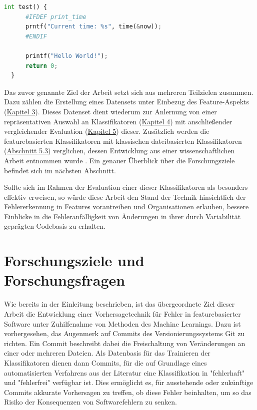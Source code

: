 \begin{lstlisting}[language=Python, caption=Exemplarische Darstellung eines fehlerhaften Features, frame=single, label=bug-code]
int test() {
	  #IFDEF print_time
	  prntf("Current time: %s", time(&now));
	  #ENDIF

	  printf("Hello World!");
	  return 0;
  }
\end{lstlisting}
 
Das zuvor genannte Ziel der Arbeit setzt sich aus mehreren Teilzielen zusammen. Dazu zählen die Erstellung eines Datensets unter Einbezug des Feature-Aspekts (\hyperref[dataset-creation]{Kapitel 3}). Dieses Datenset dient wiederum zur Anlernung von einer repräsentativen Auswahl an Klassifikatoren (\hyperref[training]{Kapitel 4}) mit anschließender vergleichender Evaluation (\hyperref[evaluation]{Kapitel 5}) dieser. Zusätzlich werden die featurebasierten Klassifikatoren mit klassischen dateibasierten Klassifikatoren (\hyperref[classic-eval]{Abschnitt 5.3}) verglichen, dessen Entwicklung aus einer wissenschaftlichen Arbeit entnommen wurde \cite{Moser2008}. Ein genauer Überblick über die Forschungsziele befindet sich im nächsten Abschnitt.

Sollte sich im Rahmen der Evaluation einer dieser Klassifikatoren als besonders effektiv erweisen, so würde diese Arbeit den Stand der Technik hinsichtlich der Fehlererkennung in Features vorantreiben und Organisationen erlauben, bessere Einblicke in die Fehleranfälligkeit von Änderungen in ihrer durch Variabilität geprägten Codebasis zu erhalten.

\section{Forschungsziele und Forschungsfragen}

Wie bereits in der Einleitung beschrieben, ist das übergeordnete Ziel dieser Arbeit die Entwicklung einer Vorhersagetechnik für Fehler in featurebasierter Software unter Zuhilfenahme von Methoden des Machine Learnings. Dazu ist vorhergesehen, das Augenmerk auf Commits des Versionierungssystems Git zu richten. Ein Commit beschreibt dabei die Freischaltung von Veränderungen an einer oder mehreren Dateien. Als Datenbasis für das Trainieren der Klassifikatoren dienen dann Commits, für die auf Grundlage eines automatisierten Verfahrens aus der Literatur eine Klassifikation in "fehlerhaft" und "fehlerfrei" verfügbar ist. Dies ermöglicht es, für ausstehende oder zukünftige Commits akkurate Vorhersagen zu treffen, ob diese Fehler beinhalten, um so das Risiko der Konsequenzen von Softwarefehlern zu senken.

